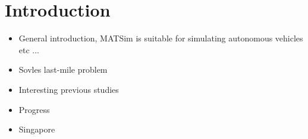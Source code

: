 \section{Introduction}

\begin{itemize}

\item General introduction, MATSim is suitable for simulating autonomous vehicles \citep{Boesch2015} etc ...

\item Sovles last-mile problem \citep{Litman2014}

\item Interesting previous studies \citep{Fagnant2014, ITF2014}

\item Progress \citep{Silberg2013, SchoettleBrandon2014}

\item Singapore \citep{Kheong2014}

\end{itemize}


